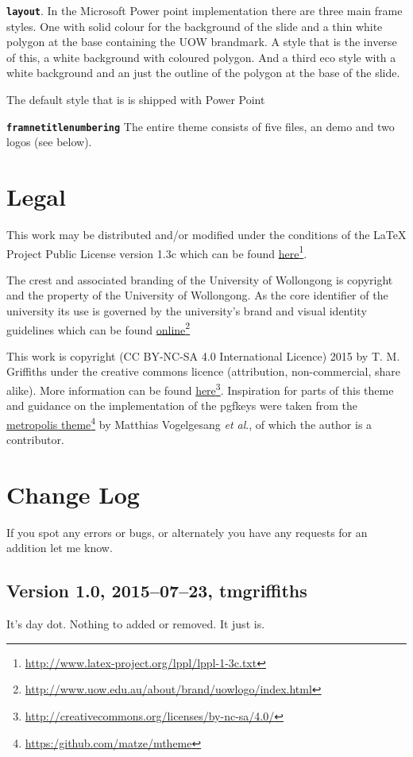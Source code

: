 \documentclass[a4paper,oneside,12pt]{article}
\newcommand{\key}[1]{\texttt{\color{UOWorange}#1}}
\begin{document}
\textbf{\key{layout}}.\marginnote{\key{key}} In the Microsoft Power point implementation there are three main frame styles. One with solid colour for the background of the slide and a thin white polygon at the base containing the UOW brandmark. A style that is the inverse of this, a white background with coloured polygon. And a third eco style with a white background and an just the outline of the polygon at the base of the slide.

The default style that is is shipped with Power Point

\textbf{\key{framnetitlenumbering}}\marginnote{\key{key}} The entire theme consists of five files, an demo and two logos (see below).

\section{Legal}
This work may be distributed and/or modified under the conditions of the LaTeX Project Public License version 1.3c which can be found \href{http://www.latex-project.org/lppl/lppl-1-3c.txt}{here}\footnote{\url{http://www.latex-project.org/lppl/lppl-1-3c.txt}}.

The crest and associated branding of the University of Wollongong is copyright and the property of the University of Wollongong. As the core identifier of the university its use is governed by the university's brand and visual identity guidelines which can be found \href{http://www.uow.edu.au/about/brand/uowlogo/index.html}{online}\footnote{\url{http://www.uow.edu.au/about/brand/uowlogo/index.html}}

This work is copyright (CC BY-NC-SA 4.0 International Licence) 2015 by T. M. Griffiths under the creative commons licence (attribution, non-commercial, share alike). More information can be found \href{http://creativecommons.org/licenses/by-nc-sa/4.0/}{here}\footnote{\url{http://creativecommons.org/licenses/by-nc-sa/4.0/}}. Inspiration for parts of this theme and guidance on the implementation of the pgfkeys were taken from the \href{https:/github.com/matze/mtheme}{metropolis theme}\footnote{\url{https:/github.com/matze/mtheme}} by Matthias Vogelgesang \textit{et al}., of which the author is a contributor. 

\begin{center}\ccbysa\end{center}

\section{Change Log}
If you spot any errors or bugs, or alternately you have any requests for an addition let me know.
\subsection*{Version 1.0, 2015–07–23, tmgriffiths}
It's day dot. Nothing to added or removed. It just is.
\end{document}
